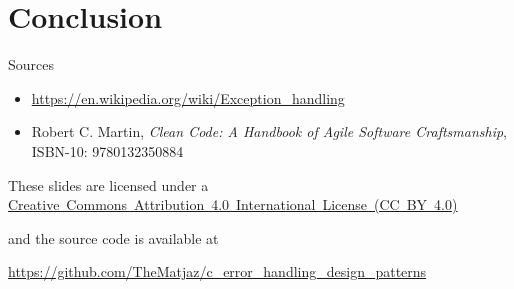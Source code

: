\documentclass[aspectratio=169,14pt]{beamer}
\begin{document}
\section{Conclusion}

\begin{frame}{Sources}
    \begin{itemize}
        \item \url{https://en.wikipedia.org/wiki/Exception_handling}
        \item Robert C. Martin, \textit{Clean Code: A Handbook of Agile Software Craftsmanship}, ISBN-10: 9780132350884 
    \end{itemize}
    
    \begin{footnotesize}
        \begin{center}
            These slides are licensed under a \href{https://creativecommons.org/licenses/by/4.0/}{Creative~Commons~Attribution~4.0~International~License~(CC~BY~4.0)}
            
            and the source code is available at
            
            \url{https://github.com/TheMatjaz/c_error_handling_design_patterns}
        \end{center}    
    \end{footnotesize}
\end{frame}
\end{document}
